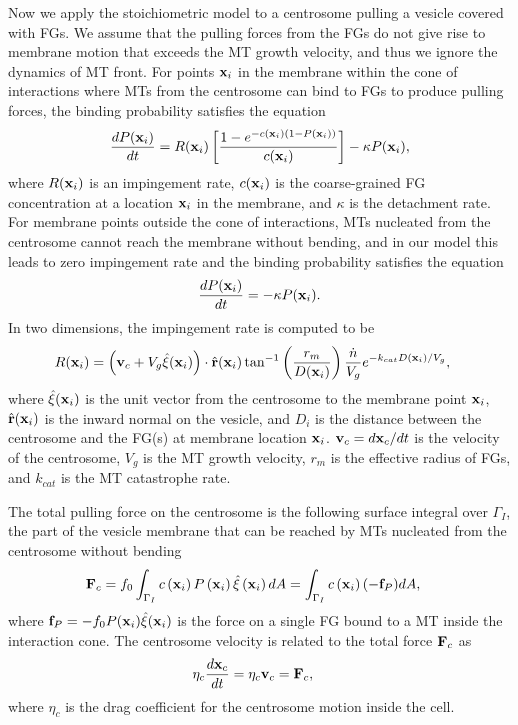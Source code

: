 \documentclass[11pt]{article}
\newcommand{\ff}{\mathbf{f}}
\begin{document}
Now we apply the stoichiometric model to a centrosome pulling a vesicle covered with FGs. We assume that the pulling forces from the FGs do not give rise to membrane motion that exceeds the MT growth velocity, and thus we ignore the dynamics of MT front. 
For points ${\bf x}_i$ in the membrane within the cone of interactions where MTs from the centrosome can bind to FGs to produce pulling forces,  the binding probability satisfies the equation
\begin{align}
\frac{d P({\bf x}_i)}{d t} = R({\bf x}_i)\left[\frac{1-e^{-c({\bf x}_i) (1-P({\bf x}_i))}}{c({\bf x}_i)}\right]-\kappa P({\bf x}_i),
\end{align}
where $R({\bf x}_i)$ is an impingement rate, $c({\bf x}_i)$ is the coarse-grained FG concentration at a location ${\bf x}_i$ in the membrane, and $\kappa$ is the detachment rate.
For membrane points outside the cone of interactions, MTs nucleated from the centrosome cannot reach the membrane without bending, and in our model this leads to zero impingement rate and the binding probability satisfies the equation
\begin{align}
\frac{d P({\bf x}_i)}{d t} = -\kappa P({\bf x}_i).
\end{align}
%
In two dimensions, the impingement rate is computed to be
\begin{align}
R({\bf x}_i)&= \left({\bf v}_c  + V_g \hat {\bf \xi}({\bf x}_i)\right)\cdot \hat {\bf r}({\bf x}_i) \tan^{-1}\left(\frac{r_m}{D({\bf x}_i)}\right)\frac{\dot n}{V_g} e^{-k_{cat} D({\bf x}_i)/V_g},
\end{align}
where $\hat{\bf \xi}({\bf x}_i)$ is the unit vector from the centrosome to the membrane point ${\bf x}_i$, $\hat{\bf r}({\bf x}_i)$ is the inward normal on the vesicle, 
and $D_i$ is the distance between the centrosome and the FG(s) at membrane location ${\bf x}_i$.
${\bf v}_c=d{\bf x}_c/dt$ is the velocity of the centrosome, $V_g$ is the MT growth velocity, $r_m$ is the effective radius of FGs, and $k_{cat}$ is the MT catastrophe rate.
%


The total pulling force on the centrosome is the following surface integral over $\Gamma_I$, 
the part of the vesicle membrane that can be reached by MTs nucleated from the centrosome without bending 
\begin{align}
{\bf F}_c &= f_0 \int_{\Gamma_I} c\left({\bf x}_i\right) P\left({\bf x}_i\right) \hat\xi\left({\bf x}_i\right) dA =  \int_{\Gamma_I} c\left({\bf x}_i\right) (-\ff_P) dA,
\end{align}
where $\ff_P = -f_0 P({\bf x}_i)\hat\xi({\bf x}_i)$ is the force on a single FG bound to a MT inside the interaction cone.
%
The centrosome velocity is related to the total force ${\bf F}_c$ as
\begin{align}
\eta_c \frac{d{\bf x}_c}{dt} &= \eta_c {\bf v}_c = {\bf F}_c,
\end{align}
where $\eta_c$ is the drag coefficient for the centrosome motion inside the cell.
\end{document}

